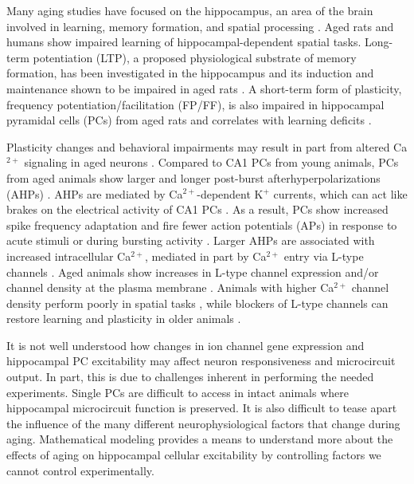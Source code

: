 \documentclass[10pt,letterpaper]{article}
\newcommand{\Ca}{Ca$^{2+}$}
\newcommand{\K}{K$^{+}$}
\begin{document}
Many aging studies have focused on the hippocampus, an area of the brain involved in learning, memory formation, and spatial processing
\cite{oh2010learning,rosenzweig2003impact}. Aged rats \cite{barnes1985age,gage1984spatial,caprioli1991spatial} and humans \cite{wilkniss1997age} show impaired learning of hippocampal-dependent spatial tasks. Long-term potentiation (LTP), a proposed physiological substrate of memory formation, has been investigated in the hippocampus and its induction and maintenance shown to be impaired in aged rats
\cite{deupree1993age,rosenzweig1997role}. A short-term form of plasticity, frequency potentiation/facilitation (FP/FF), is also impaired in hippocampal pyramidal cells (PCs) from aged rats and correlates with learning deficits
\cite{landfield1978impaired}.

Plasticity changes and behavioral impairments may result in part from altered Ca$^{2+}$ signaling
in aged neurons
\cite{oh2010learning,rosenzweig2003impact}. Compared to CA1 PCs from young animals, PCs from aged animals show larger and longer post-burst afterhyperpolarizations (AHPs)
\cite{landfield1984prolonged,gant2009action,power2002age}. AHPs
are mediated by {\Ca}-dependent {\K} currents, which can act like brakes on the electrical activity of CA1 PCs
\cite{alger1980epileptiform,hotson1980calcium}. As a result, PCs show increased spike frequency adaptation and fire fewer action potentials (APs) in response to acute stimuli or during bursting activity 
\cite{gant2006early,moyer1992nimodipine,tombaugh2005slow}. Larger AHPs are associated with increased intracellular Ca$^{2+}$, mediated in part by {\Ca} entry via L-type channels
\cite{campbell1996aging,moyer1992nimodipine,power2002age,thibault2001elevated}. Aged
animals show increases in L-type channel expression and/or channel
density at the plasma membrane
\cite{herman1998up,thibault1996increase,veng2002regionally,nunez2014surface}.
Animals with higher {\Ca} channel density perform poorly in spatial
tasks  \cite{thibault1996increase}, while blockers of L-type channels can
restore learning and plasticity in older animals
\cite{norris1998reversal,sandin1990aging}.

It is not well understood how changes in ion channel gene expression and hippocampal PC excitability may affect neuron responsiveness and microcircuit output. In part, this is due
to challenges inherent in performing the needed experiments. Single PCs are difficult
to access in intact animals where hippocampal microcircuit function is
preserved. It is also difficult to tease apart the influence of the many different neurophysiological factors that change during aging. Mathematical modeling provides a means to understand more about the effects of aging on hippocampal cellular excitability by controlling factors we cannot control experimentally.
\end{document}
